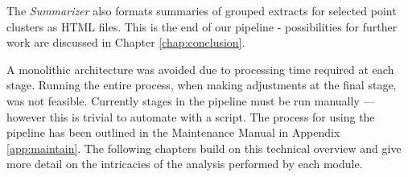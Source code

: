   The \textit{Summarizer} also formats summaries of grouped extracts for selected point clusters as HTML files. This is the end of our pipeline - possibilities for further work are discussed in Chapter \ref{chap:conclusion}.

  A monolithic architecture was avoided due to processing time required at each stage. Running the entire process, when making adjustments at the final stage, was not feasible. Currently stages in the pipeline must be run manually --- however this is trivial to automate with a script. The process for using the pipeline has been outlined in the Maintenance Manual in Appendix \ref{app:maintain}. The following chapters build on this technical overview and give more detail on the intricacies of the analysis performed by each module.
